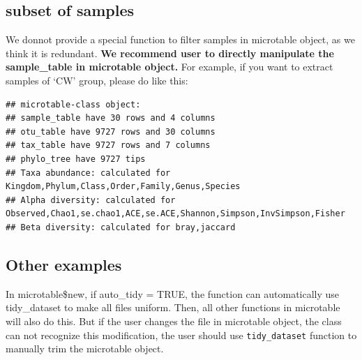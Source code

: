 \documentclass[
]{book}
\newenvironment{Shaded}{\begin{snugshade}}{\end{snugshade}}
\newcommand{\CommentTok}[1]{\textcolor[rgb]{0.56,0.35,0.01}{\textit{#1}}}
\newcommand{\FunctionTok}[1]{\textcolor[rgb]{0.00,0.00,0.00}{#1}}
\newcommand{\NormalTok}[1]{#1}
\newcommand{\OtherTok}[1]{\textcolor[rgb]{0.56,0.35,0.01}{#1}}
\newcommand{\SpecialCharTok}[1]{\textcolor[rgb]{0.00,0.00,0.00}{#1}}
\newcommand{\StringTok}[1]{\textcolor[rgb]{0.31,0.60,0.02}{#1}}
\begin{document}
\hypertarget{subset-of-samples}{%
\subsection{subset of samples}\label{subset-of-samples}}

We donnot provide a special function to filter samples in microtable object, as we think it is redundant.
\textbf{We recommend user to directly manipulate the sample\_table in microtable object.}
For example, if you want to extract samples of `CW' group, please do like this:

\begin{Shaded}
\end{Shaded}

\begin{verbatim}
## microtable-class object:
## sample_table have 30 rows and 4 columns
## otu_table have 9727 rows and 30 columns
## tax_table have 9727 rows and 7 columns
## phylo_tree have 9727 tips
## Taxa abundance: calculated for Kingdom,Phylum,Class,Order,Family,Genus,Species 
## Alpha diversity: calculated for Observed,Chao1,se.chao1,ACE,se.ACE,Shannon,Simpson,InvSimpson,Fisher 
## Beta diversity: calculated for bray,jaccard
\end{verbatim}

\hypertarget{other-examples}{%
\subsection{Other examples}\label{other-examples}}

In microtable\$new, if auto\_tidy = TRUE, the function can automatically use tidy\_dataset to make all files uniform.
Then, all other functions in microtable will also do this. But if the user changes the file in microtable object,
the class can not recognize this modification, the user should use \texttt{tidy\_dataset} function to manually trim the microtable object.
\end{document}
